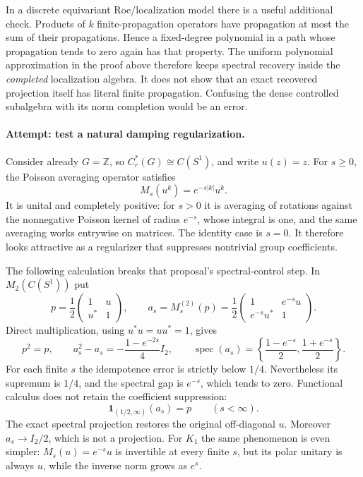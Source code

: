 \documentclass[11pt]{article}
\newcommand{\Z}{\mathbb{Z}}
\begin{document}
In a discrete equivariant Roe/localization model there is a useful
additional check. Products of $k$ finite-propagation operators have
propagation at most the sum of their propagations. Hence a fixed-degree
polynomial in a path whose propagation tends to zero again has that
property. The uniform polynomial approximation in the proof above
therefore keeps spectral recovery inside the \emph{completed}
localization algebra. It does not show that an exact recovered projection
itself has literal finite propagation. Confusing the dense controlled
subalgebra with its norm completion would be an error.

\paragraph{Attempt: test a natural damping regularization.}
Consider already $G=\Z$, so $C_r^*(G)\cong C(S^1)$, and write $u(z)=z$.
For $s\ge0$, the Poisson averaging operator satisfies
\[
 M_s(u^k)=e^{-s|k|}u^k.
\]
It is unital and completely positive: for $s>0$ it is averaging of
rotations against the nonnegative Poisson kernel of radius $e^{-s}$,
whose integral is one, and the same averaging works entrywise on
matrices. The identity case is $s=0$. It therefore looks attractive as a
regularizer that suppresses nontrivial group coefficients.

The following calculation breaks that proposal's spectral-control step.
In $M_2(C(S^1))$ put
\[
 p=\frac12\begin{pmatrix}1&u\\u^*&1\end{pmatrix},\qquad
 a_s=M_s^{(2)}(p)=\frac12
 \begin{pmatrix}1&e^{-s}u\\e^{-s}u^*&1\end{pmatrix}.
\]
Direct multiplication, using $u^*u=uu^*=1$, gives
\begin{equation}\label{ra:53:damping}
 p^2=p,\qquad
 a_s^2-a_s=-\frac{1-e^{-2s}}4 I_2,
 \qquad
 \operatorname{spec}(a_s)=
 \left\{\frac{1-e^{-s}}2,\frac{1+e^{-s}}2\right\}.
\end{equation}
For each finite $s$ the idempotence error is strictly below $1/4$.
Nevertheless its supremum is $1/4$, and the spectral gap is $e^{-s}$,
which tends to zero. Functional calculus does not retain the coefficient
suppression:
\begin{equation}\label{ra:53:undamping}
 \mathbf1_{(1/2,\infty)}(a_s)=p\qquad(s<\infty).
\end{equation}
The exact spectral projection restores the original off-diagonal $u$.
Moreover $a_s\to I_2/2$, which is not a projection. For $K_1$ the same
phenomenon is even simpler: $M_s(u)=e^{-s}u$ is invertible at every finite
$s$, but its polar unitary is always $u$, while the inverse norm grows
as $e^s$.
\end{document}
